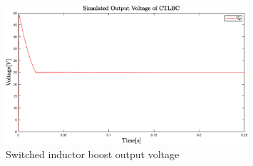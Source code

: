 \begin{figure} [H]
   \centering
   \includegraphics[width=0.8\textwidth]{figures/dConventionalThreeLevelBC/Simulation_CTLBC.eps}
    \caption{Switched inductor boost output voltage}
	\label{fig:Simulation_CTLBC}
\end{figure}